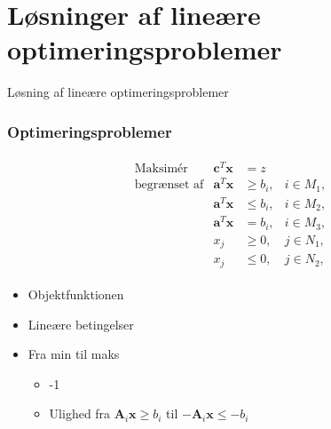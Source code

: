 \section{Løsninger af lineære optimeringsproblemer}
%
\begin{frame}
\centering
\Huge
Løsning af lineære optimeringsproblemer 
\end{frame}
%

\begin{frame}
\frametitle{Optimeringsproblemer}
\begin{align*}
\begin{array}{lrll}
\text{Maksimér}		&\textbf{c}^T\textbf{x}	& = z		&\\
\text{begrænset af}	&\textbf{a}^T\textbf{x}	&\geq b_i,	&i \in M_1,\\
					&\textbf{a}^T\textbf{x}	&\leq b_i,	&i \in M_2,\\
					&\textbf{a}^T\textbf{x}	& = b_i,	&i \in M_3,\\
					&x_j					&\geq 0,	&j \in N_1,\\
					&x_j					&\leq 0,	&j \in N_2,
\end{array}
\end{align*}
\begin{itemize}
\item Objektfunktionen
\item Lineære betingelser 
\item Fra min til maks 
\begin{itemize}
\item -1 
\item Ulighed fra $\textbf{A}_i \textbf{x} \geq b_i$ til $-\textbf{A}_i \textbf{x} \leq -b_i$
\end{itemize}
\end{itemize}
\end{frame}

